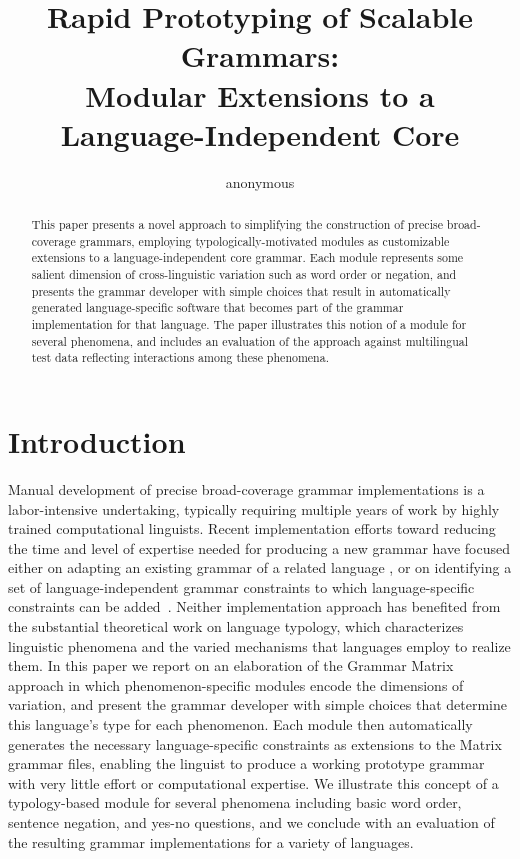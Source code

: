 \documentclass[11pt]{article}
\title{Rapid Prototyping of Scalable Grammars:\\
       Modular Extensions to a Language-Independent Core}
\author{anonymous}
\date{}
\begin{document}
\maketitle
\begin{abstract}
This paper presents a novel approach to simplifying the construction of 
precise broad-coverage grammars, employing typologically-motivated modules
as customizable extensions to a language-independent core grammar.  Each
module represents some salient dimension of cross-linguistic variation such
as word order or negation, and presents the grammar developer with simple 
choices that result in automatically generated language-specific software 
that becomes part of the grammar implementation for that language.  The 
paper illustrates this notion of a module for several phenomena, and 
includes an evaluation of the approach against multilingual test data
reflecting interactions among these phenomena.
\end{abstract}

\section{Introduction}
Manual development of precise broad-coverage grammar implementations
is a labor-intensive undertaking, typically requiring multiple years
of work by highly trained computational linguists.  Recent implementation
efforts toward reducing the time and level of expertise needed for producing
a new grammar have focused either on adapting an existing grammar of a
related language \cite{Butt-et-al-02,Kim:Dal:Kap:Kin:Mas:Ohk:03,Bat:Kru:Kru:ta}, or
on identifying a set of language-independent grammar constraints to
which language-specific constraints can be added~\cite{Ben:Fli:Oe:02}.
Neither implementation approach has benefited from the substantial
theoretical work on language typology, which characterizes linguistic
phenomena and the varied mechanisms that languages employ to realize
them.  In this paper we report on an elaboration of the Grammar Matrix
approach in which phenomenon-specific modules encode the dimensions of
variation, and present the grammar developer with simple choices that
determine this language's type for each phenomenon. Each module then
automatically generates the necessary language-specific constraints as
extensions to the Matrix grammar files, enabling the linguist to
produce a working prototype grammar with very little effort or
computational expertise.  We illustrate this concept of a
typology-based module for several phenomena including basic word
order, sentence negation, and yes-no questions, and we conclude with
an evaluation of the resulting grammar implementations for a variety
of languages.
\end{document}
